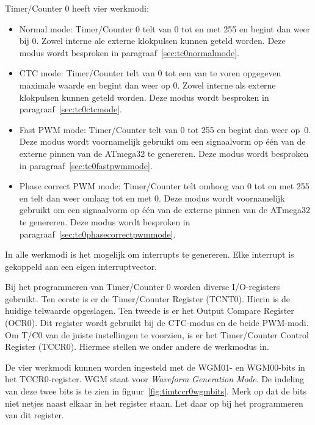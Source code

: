 Timer/Counter 0 heeft vier werkmodi:

\begin{itemize}
\item Normal mode: Timer/Counter 0 telt van 0 tot en met 255 en begint dan
weer bij 0. Zowel interne ale externe klokpulsen kunnen geteld worden. Deze
modus wordt besproken in paragraaf~\ref{sec:tc0normalmode}.

\item CTC mode: Timer/Counter telt van 0 tot een van te voren opgegeven
maximale waarde en begint dan weer op 0. Zowel interne als externe klokpulsen
kunnen geteld worden. Deze modus wordt besproken in
paragraaf~\ref{sec:tc0ctcmode}.

\item Fast PWM mode: Timer/Counter telt van 0 tot 255 en begint dan weer op~0.
Deze modus wordt voornamelijk gebruikt om een signaalvorm op \'e\'en van de externe
pinnen van de ATmega32 te genereren. Deze modus wordt besproken in
paragraaf~\ref{sec:tc0fastpwmmode}.

\item Phase correct PWM mode: Timer/Counter telt omhoog van 0 tot en met 255
en telt dan weer omlaag tot en met 0. Deze modus wordt voornamelijk gebruikt om een
signaalvorm op \'e\'en van de externe pinnen van de ATmega32 te genereren.
Deze modus wordt besproken in paragraaf~\ref{sec:tc0phasecorrectpwmmode}.
\end{itemize}

In alle werkmodi is het mogelijk om interrupts te genereren. Elke interrupt
is gekoppeld aan een eigen interruptvector.

Bij het programmeren van Timer/Counter 0 worden diverse I/O-registers
gebruikt. Ten eerste is er de Timer/Counter Register (TCNT0). Hierin is de
huidige telwaarde opgeslagen. Ten tweede is er het Output Compare
Register (OCR0). Dit register wordt gebruikt bij de CTC-modus en de beide
PWM-modi. Om T/C0 van de juiste instellingen te voorzien, is er het
Timer/Counter Control Register (TCCR0). Hiermee stellen we onder andere de
werkmodus in.

De vier werkmodi kunnen worden ingesteld met de WGM01- en WGM00-bits in het
TCCR0-register. WGM staat voor \textsl{Waveform Generation Mode}.
De indeling van deze twee bits is te zien in
figuur~\ref{fig:timtccr0wgmbits}. Merk op dat de bits niet netjes naast
elkaar in het register staan. Let daar op bij het programmeren van dit
register.

